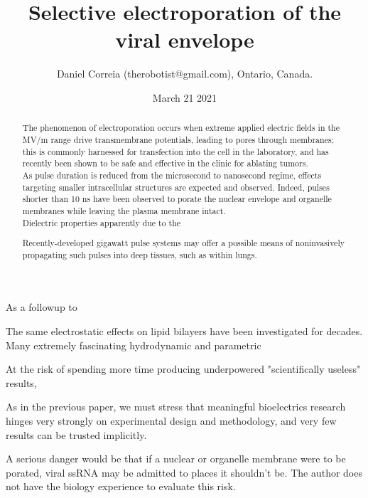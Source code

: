 \documentclass[fleqn,10pt]{article}
\begin{document}
\title{Selective electroporation of the viral envelope}
\author{\small{Daniel Correia (therobotist@gmail.com), Ontario, Canada.}}
\date{March 21 2021}

\flushbottom 
\maketitle
\thispagestyle{empty}

\renewcommand{\abstractname}{Summary}    %



\begin{abstract}
	\noindent The phenomenon of electroporation occurs when extreme applied electric fields in the MV/m range drive transmembrane potentials, leading to pores through membranes; this is commonly harnessed for transfection into the cell in the laboratory, and has recently been shown to be safe and effective in the clinic for ablating tumors.\\
	
	\noindent As pulse duration is reduced from the microsecond to nanosecond regime, effects targeting smaller intracellular structures are expected and observed. Indeed, pulses shorter than 10 ns have been observed to porate the nuclear envelope and organelle membranes while leaving the plasma membrane intact. \\
	
	Dielectric properties apparently due to the 
	
	\noindent Recently-developed gigawatt pulse systems may offer a possible means of noninvasively propagating such pulses into deep tissues, such as within lungs. 
\end{abstract}

As a followup to \cite{notes2021}

The same electrostatic effects on lipid bilayers have been investigated for decades. Many extremely fascinating hydrodynamic and parametric 

At the risk of spending more time producing underpowered "scientifically useless" results, 

As in the previous paper, we must stress that meaningful bioelectrics research hinges very strongly on experimental design and methodology, and very few results can be trusted implicitly.


A serious danger would be that if a nuclear or organelle membrane were to be porated, viral ssRNA may be admitted to places it shouldn't be. The author does not have the biology experience to evaluate this risk.
\end{document}

